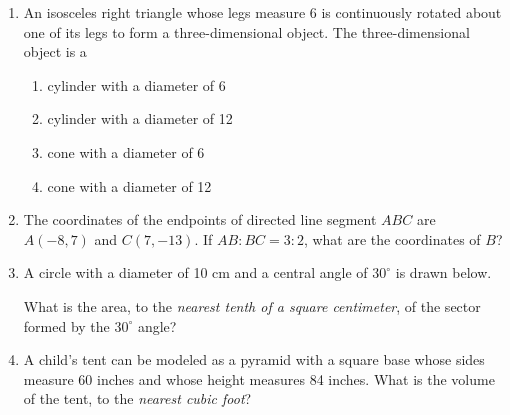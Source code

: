 \documentclass[12pt, oneside]{article}
\begin{document}
\begin{enumerate}[itemsep=2cm]
\newpage
\item An isosceles right triangle whose legs measure 6 is continuously rotated about one of its legs to form a three-dimensional object. The three-dimensional object is a
  \begin{enumerate}
    \item cylinder with a diameter of 6
    \item cylinder with a diameter of 12
    \item cone with a diameter of 6
    \item cone with a diameter of 12
  \end{enumerate}

\item The coordinates of the endpoints of directed line segment $ABC$ are $A(-8,7)$ and $C(7,-13)$. If $AB:BC = 3:2$, what are the coordinates of $B$?

\item A circle with a diameter of 10 cm and a central angle of $30^\circ$ is drawn below.
\begin{center}
  \end{center}
  What is the area, to the \emph{nearest tenth of a square centimeter}, of the sector formed by the $30^\circ$ angle?

\item A child's tent can be modeled as a pyramid with a square base whose sides measure 60 inches and whose height measures 84 inches. What
is the volume of the tent, to the \emph{nearest cubic foot}?

\end{enumerate}
\end{document}
